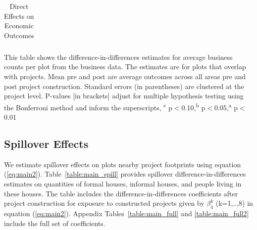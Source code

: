 \documentclass[12pt]{article}
\newcommand{\regtextfirst}{
Mean pre and post are average outcomes across all areas pre and post project construction.  Standard errors (in parentheses) are clustered at the project level.  P-values [in brackets] adjust for multiple hypothesis testing using the Bonferroni method and inform the superscripts, \textsuperscript{c} p$<$0.10,\textsuperscript{b} p$<$0.05,\textsuperscript{a} p$<$0.01 \,\,
}
\newcommand{\rv}{}
\begin{document}
\begin{table}[h!]
\small
\centering
\caption{Direct Effects on Economic Outcomes}\label{table:agglom_proj}
\vspace{-2mm}
\begin{threeparttable}
\begin{tabular}{lCC}
\toprule

\bottomrule
\end{tabular}
\begin{tablenotes}
\item \footnotesize 
This table shows the difference-in-differences estimates for average business counts per plot from the business data.  The estimates are for plots that overlap with projects. \regtextfirst
\end{tablenotes}
\end{threeparttable}
\end{table}



\subsection{Spillover Effects}\label{section:spillovereffects}

\rv{We estimate spillover effects on plots nearby project footprints using equation (\ref{eq:main2}).  Table~\ref{table:main_spill} provides spillover difference-in-differences estimates on quantities of formal houses, informal houses, and people living in these houses.  The table includes the difference-in-differences coefficients after project construction for exposure to constructed projects given by $\beta_4^{k}$ (k=1,..,8) in equation (\ref{eq:main2}).  Appendix Tables~\ref{table:main_full} and \ref{table:main_full2} include the full set of coefficients.   }

\begin{table}[h!]
\small
\centering
\caption{Spillover Effects on Population and Informal Housing}\label{table:main_spill}
\vspace{-2mm}
\end{table}
\end{document}
